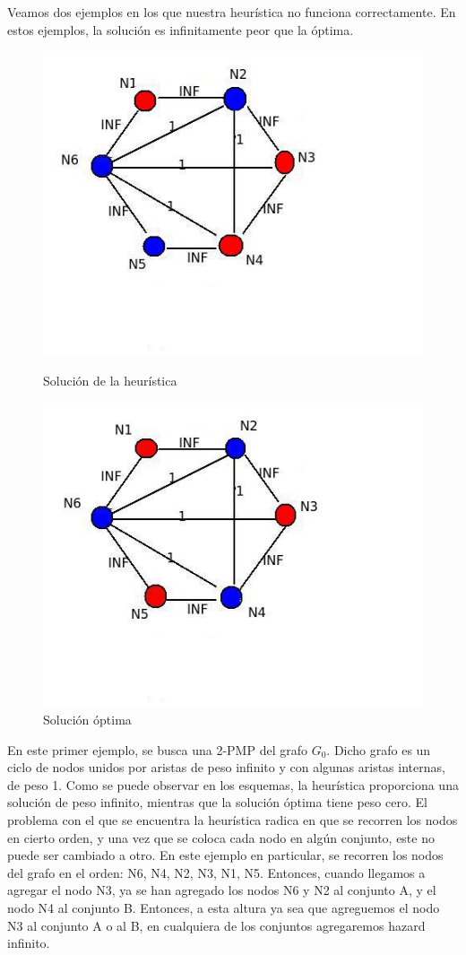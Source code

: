 \documentclass[11pt, a4paper, twoside]{article}
\begin{document}
\begin{enumerate}
		Veamos dos ejemplos en los que nuestra heurística no funciona correctamente. En estos ejemplos,
		la solución es infinitamente peor que la óptima.
		
		\begin{figure}[H]
			\begin{minipage}{.6\textwidth}
			\centering
			\includegraphics[width=.8\linewidth]{imagenes/ej3_11}
			\caption{Solución de la heurística}
			\end{minipage}
			\begin{minipage}{.6\textwidth}
			\includegraphics[width=.8\linewidth]{imagenes/ej3_12}
			\caption{Solución óptima}
			\end{minipage}
		\end{figure}
		
		En este primer ejemplo, se busca una 2-PMP del grafo $G_{0}$. Dicho grafo es un ciclo de nodos unidos por aristas 
		de peso infinito y con algunas aristas internas, de peso 1. Como se puede observar en los esquemas,
		la heurística proporciona una solución de peso infinito, mientras que la solución óptima tiene peso cero.
		El problema con el que se encuentra la heurística radica en que se recorren los nodos en cierto orden, y
		una vez que se coloca cada nodo en algún conjunto, este no puede ser cambiado a otro. En este 
		ejemplo en particular, se recorren los nodos del grafo en el orden: N6, N4, N2, N3, N1, N5. Entonces,
		cuando llegamos a agregar el nodo N3, ya se han agregado los nodos N6 y N2 al conjunto A, y el nodo
		N4 al conjunto B. Entonces, a esta altura ya sea que  agreguemos el nodo N3 al conjunto A o al B, en 
		cualquiera de los conjuntos agregaremos hazard infinito.
		

\end{enumerate}
\end{document}
